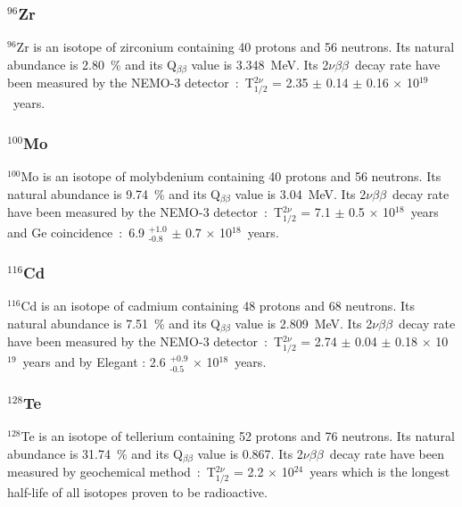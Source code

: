 \documentclass[main.tex]{subfiles}
\begin{document}
\subsubsection{$^{\text{96}}$Zr}


\NI $^\text{96}$Zr is an isotope of zirconium containing 40 protons and 56 neutrons. Its natural abundance is 2.80~\% and its Q$_{\beta\beta}$ value is 3.348~MeV. Its 2$\nu\beta\beta$~decay rate have been measured by the NEMO-3 detector~:~T$_{\text{1/2}}^{\text{2}\nu}$ = 2.35 $\pm$ 0.14 $\pm$ 0.16 $\times$ 10$^{\text{19}}$~years.


\subsubsection{$^{\text{100}}$Mo}


\NI $^\text{100}$Mo is an isotope of molybdenium containing 40 protons and 56 neutrons. Its natural abundance is 9.74~\% and its Q$_{\beta\beta}$ value is 3.04~MeV. Its 2$\nu\beta\beta$~decay rate have been measured by the NEMO-3 detector~:~T$_{\text{1/2}}^{\text{2}\nu}$ = 7.1 $\pm$ 0.5 $\times$ 10$^{\text{18}}$~years and Ge coincidence~:~6.9 $^{\text{+1.0}}_{\text{-0.8}}$ $\pm$ 0.7 $\times$ 10$^{\text{18}}$~years.


\subsubsection{$^{\text{116}}$Cd}


\NI $^\text{116}$Cd is an isotope of cadmium containing 48 protons and 68 neutrons. Its natural abundance is 7.51~\% and its Q$_{\beta\beta}$ value is 2.809~MeV. Its 2$\nu\beta\beta$~decay rate have been measured by the NEMO-3 detector~:~T$_{\text{1/2}}^{\text{2}\nu}$ = 2.74 $\pm$ 0.04 $\pm$ 0.18 $\times$ 10$^{\text{19}}$~years and by Elegant : 2.6 $^{\text{+0.9}}_{\text{-0.5}}$ $\times$ 10$^{\text{18}}$~years.


\subsubsection{$^{\text{128}}$Te}


\NI $^\text{128}$Te is an isotope of tellerium containing 52 protons and 76 neutrons. Its natural abundance is 31.74~\% and its Q$_{\beta\beta}$ value is 0.867. Its 2$\nu\beta\beta$~decay rate have been measured by geochemical method~:~T$_{\text{1/2}}^{\text{2}\nu}$ = 2.2 $\times$ 10$^{\text{24}}$~years which is the longest half-life of all isotopes proven to be radioactive.
\end{document}
